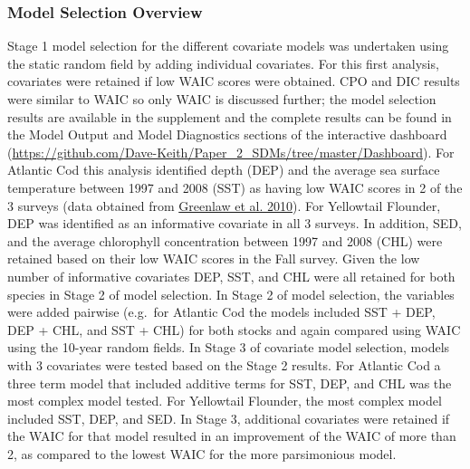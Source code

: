 \documentclass[
]{article}
\begin{document}
\hypertarget{model-selection-overview}{%
\subsubsection{Model Selection Overview}\label{model-selection-overview}}

Stage 1 model selection for the different covariate models was undertaken using the static random field by adding individual covariates. For this first analysis, covariates were retained if low WAIC scores were obtained. CPO and DIC results were similar to WAIC so only WAIC is discussed further; the model selection results are available in the supplement and the complete results can be found in the Model Output and Model Diagnostics sections of the interactive dashboard (\url{https://github.com/Dave-Keith/Paper_2_SDMs/tree/master/Dashboard}). For Atlantic Cod this analysis identified depth (DEP) and the average sea surface temperature between 1997 and 2008 (SST) as having low WAIC scores in 2 of the 3 surveys (data obtained from \protect\hyperlink{ref-greenlawGeodatabaseHistoricalContemporary2010}{Greenlaw et al. 2010}). For Yellowtail Flounder, DEP was identified as an informative covariate in all 3 surveys. In addition, SED, and the average chlorophyll concentration between 1997 and 2008 (CHL) were retained based on their low WAIC scores in the Fall survey. Given the low number of informative covariates DEP, SST, and CHL were all retained for both species in Stage 2 of model selection. In Stage 2 of model selection, the variables were added pairwise (e.g.~for Atlantic Cod the models included SST + DEP, DEP + CHL, and SST + CHL) for both stocks and again compared using WAIC using the 10-year random fields. In Stage 3 of covariate model selection, models with 3 covariates were tested based on the Stage 2 results. For Atlantic Cod a three term model that included additive terms for SST, DEP, and CHL was the most complex model tested. For Yellowtail Flounder, the most complex model included SST, DEP, and SED. In Stage 3, additional covariates were retained if the WAIC for that model resulted in an improvement of the WAIC of more than 2, as compared to the lowest WAIC for the more parsimonious model.
\end{document}

